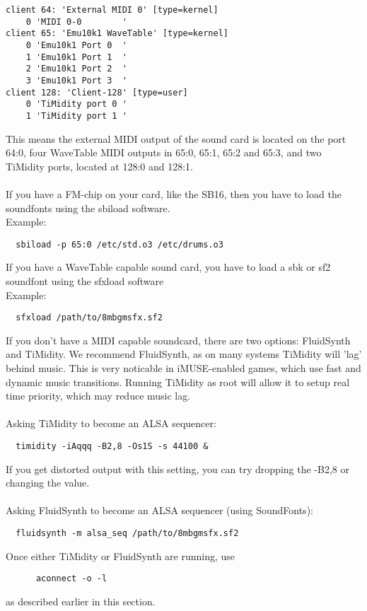 \begin{verbatim}
client 64: 'External MIDI 0' [type=kernel]
    0 'MIDI 0-0        '
client 65: 'Emu10k1 WaveTable' [type=kernel]
    0 'Emu10k1 Port 0  '
    1 'Emu10k1 Port 1  '
    2 'Emu10k1 Port 2  '
    3 'Emu10k1 Port 3  '
client 128: 'Client-128' [type=user]
    0 'TiMidity port 0 '
    1 'TiMidity port 1 '
\end{verbatim}
%
This means the external MIDI output of the sound card is located on the
port 64:0, four WaveTable MIDI outputs in 65:0, 65:1, 65:2
and 65:3, and two TiMidity ports, located at 128:0 and 128:1.\\
~\\
If you have a FM-chip on your card, like the SB16, then you have to load
the soundfonts using the sbiload software. \\
Example:
\begin{verbatim}
  sbiload -p 65:0 /etc/std.o3 /etc/drums.o3
\end{verbatim}
%
If you have a WaveTable capable sound card, you have to load a sbk or sf2
soundfont using the sfxload software\\
Example:
\begin{verbatim}
  sfxload /path/to/8mbgmsfx.sf2
\end{verbatim}
%
If you don't have a MIDI capable soundcard, there are two options: FluidSynth
and TiMidity. We recommend FluidSynth, as on many systems TiMidity will 'lag'
behind music. This is very noticable in iMUSE-enabled games, which use fast
and dynamic music transitions. Running TiMidity as root will allow it to
setup real time priority, which may reduce music lag.\\
~\\
Asking TiMidity to become an ALSA sequencer:
\begin{verbatim}
  timidity -iAqqq -B2,8 -Os1S -s 44100 &
\end{verbatim}
If you get distorted output with this setting, you can try dropping the 
-B2,8 or changing the value.\\
~\\
Asking FluidSynth to become an ALSA sequencer (using SoundFonts):
\begin{verbatim}
  fluidsynth -m alsa_seq /path/to/8mbgmsfx.sf2
\end{verbatim}
%
Once either TiMidity or FluidSynth are running, use
\begin{verbatim}
      aconnect -o -l
\end{verbatim}
as described earlier in this section.